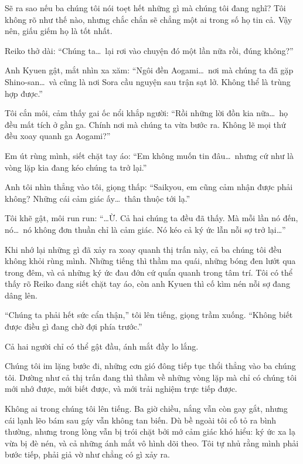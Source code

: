 \documentclass[../main.tex]{subfiles}
\begin{document}
Sẽ ra sao nếu ba chúng tôi nói toẹt hết những gì mà chúng tôi đang nghĩ? Tôi không rõ như thế nào, nhưng chắc chắn sẽ chẳng một ai trong số họ tin cả. Vậy nên, giấu giếm họ là tốt nhất.

Reiko thở dài: ``Chúng ta\dots\ lại rơi vào chuyện đó một lần nữa rồi, đúng không?''

Anh Kyuen gật, mắt nhìn xa xăm:
``Ngôi đền Aogami\dots\ nơi mà chúng ta đã gặp Shino-san\dots\ và cũng là nơi Sora cầu nguyện sau trận sạt lở. Không thể là trùng hợp được.''

Tôi cắn môi, cảm thấy gai ốc nổi khắp người: ``Rồi những lời đồn kia nữa\dots\ họ đều mất tích ở gần ga. Chính nơi mà chúng ta vừa bước ra. Không lẽ mọi thứ đều xoay quanh ga Aogami?''

Em út rùng mình, siết chặt tay áo:
``Em không muốn tin đâu\dots\ nhưng cứ như là vòng lặp kia đang kéo chúng ta trở lại.''

Anh tôi nhìn thẳng vào tôi, giọng thấp: ``Saikyou, em cũng cảm nhận được phải không? Những cái cảm giác ấy\dots\ thân thuộc tới lạ.''

Tôi khẽ gật, môi run run:
``\dots Ừ. Cả hai chúng ta đều đã thấy. Mà mỗi lần nó đến, nó\dots\ nó không đơn thuần chỉ là cảm giác. Nó kéo cả ký ức lẫn nỗi sợ trở lại\dots''

Khi nhớ lại những gì đã xảy ra xoay quanh thị trấn này, cả ba chúng tôi đều không khỏi rùng mình. Những tiếng thì thầm ma quái, những bóng đen lướt qua trong đêm, và cả những ký ức đau đớn cứ quẩn quanh trong tâm trí. Tôi có thể thấy rõ Reiko đang siết chặt tay áo, còn anh Kyuen thì cố kìm nén nỗi sợ đang dâng lên.

``Chúng ta phải hết sức cẩn thận,'' tôi lên tiếng, giọng trầm xuống. ``Không biết được điều gì đang chờ đợi phía trước.''

Cả hai người chỉ có thể gật đầu, ánh mắt đầy lo lắng.

Chúng tôi im lặng bước đi, những cơn gió đông tiếp tục thổi thẳng vào ba chúng tôi. Dường như cả thị trấn đang thì thầm về những vòng lặp mà chỉ có chúng tôi mới nhớ được, mới biết được, và mới trải nghiệm trực tiếp được.

\ct

Không ai trong chúng tôi lên tiếng. Ba giờ chiều, nắng vẫn còn gay gắt, nhưng cái lạnh lẽo bám sau gáy vẫn không tan biến. Dù bề ngoài tôi cố tỏ ra bình thường, nhưng trong lòng vẫn bị trói chặt bởi mớ cảm giác khó hiểu: ký ức xa lạ vừa bị đè nén, và cả những ánh mắt vô hình dõi theo. Tôi tự nhủ rằng mình phải bước tiếp, phải giả vờ như chẳng có gì xảy ra.
\end{document}
